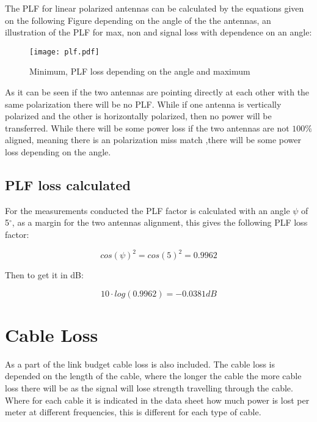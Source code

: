 The PLF for linear polarized antennas can be calculated by the equations given on the following Figure depending on the angle of the the antennas, an illustration of the PLF for max, non and signal loss with dependence on an angle:

\begin{figure}[H]
\centering
\texttt{[image: plf.pdf]}
\caption{Minimum, PLF loss depending on the angle and maximum  \citep{plf_illu}}
\label{fig:lin_plf}
\end{figure} 

As it can be seen if the two antennas are pointing directly at each other with the same polarization there will be no PLF. While if one antenna is vertically polarized and the other is horizontally polarized, then no power will be transferred. While there will be some power loss if the two antennas are not $100\%$ aligned, meaning there is an polarization miss match ,there will be some power loss depending on the angle.

\subsection{PLF loss calculated}

For the measurements conducted the PLF factor is calculated with an angle $\psi$ of 5$^{\circ}$, as a margin for the two antennas alignment, this gives the following PLF loss factor:

\begin{equation}
cos(\psi)^{2} = cos(5)^2 = 0.9962
\end{equation}

Then to get it in dB:

\begin{equation}
10 \cdot log(0.9962) = -0.0381dB
\end{equation}





\section{Cable Loss}
As a part of the link budget cable loss is also included. The cable loss is depended on the length of the cable, where the longer the cable the more cable loss there will be as the signal will lose strength travelling through the cable. Where for each cable it is indicated in the data sheet how much power is lost per meter at different frequencies, this is different for each type of cable. 


